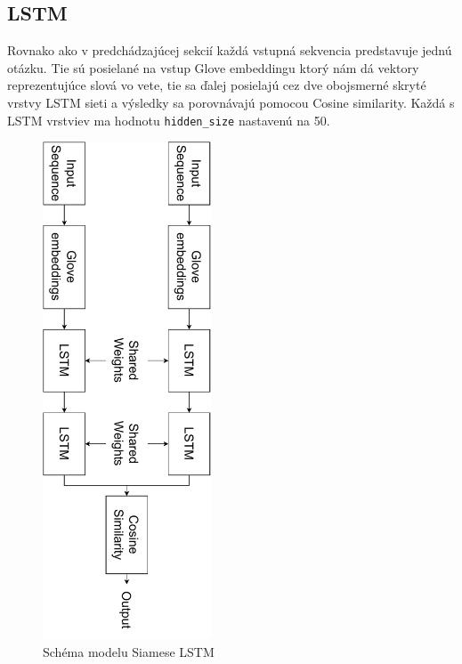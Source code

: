 \documentclass[a4paper, 16pt]{article}
\begin{document}
\subsection{LSTM}
\label{LSTM_a}
Rovnako ako v predchádzajúcej sekcií každá vstupná sekvencia predstavuje jednú otázku. Tie sú posielané na vstup Glove embeddingu ktorý nám dá vektory reprezentujúce slová vo vete, tie sa ďalej posielajú cez dve obojsmerné skryté vrstvy LSTM sieti a výsledky sa porovnávajú pomocou Cosine similarity. Každá s LSTM vrstviev ma hodnotu \texttt{hidden\_size} nastavenú na 50.
\begin{figure}[H]
    \centering
    \includegraphics[width=5cm, angle =90 ]{LSTM.pdf}
    \caption{Schéma modelu Siamese LSTM}
    \label{fig:4}
\end{figure}
\end{document}
